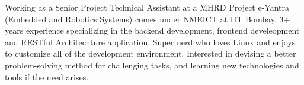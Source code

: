 

\begin{cvparagraph}

Working as a Senior Project Technical Assistant at a MHRD Project e-Yantra (Embedded and Robotics Systems) comes under NMEICT at IIT Bombay. 3+ years experience specializing in the backend development, frontend develeopment and RESTful Architechture application. Super nerd who loves Linux and enjoys to customize all of the development environment. Interested in devising a better problem-solving method for challenging tasks, and learning new technologies and tools if the need arises.
\end{cvparagraph}
